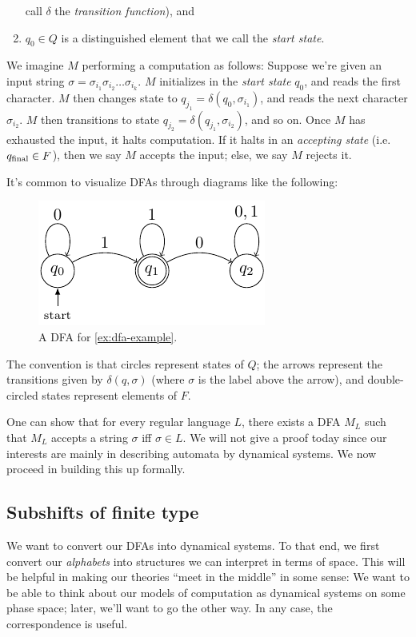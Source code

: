 \documentclass{fkpaper}
\begin{document}
\begin{multicols}{2}
\begin{definition}
\begin{enumerate}
      call $\delta$ the \emph{transition function}), and
    \item $q_0 \in Q$ is a distinguished element that we call the
      \emph{start state}. \qedhere
  \end{enumerate}
\end{definition}
We imagine $M$ performing a computation as follows: Suppose we're
given an input string $\sigma = \sigma_{i_1} \sigma_{i_2} \ldots
\sigma_{i_k}$. $M$ initializes in the \emph{start state} $q_0$, and
reads the first character. $M$ then changes state to $q_{j_1} =
\delta(q_0, \sigma_{i_1})$, and reads the next character
$\sigma_{i_2}$. $M$ then transitions to state $q_{j_2} =
\delta(q_{j_1}, \sigma_{i_2})$, and so on. Once $M$ has exhausted the
input, it halts computation. If it halts in an \emph{accepting state}
(i.e.\ $q_{\rm final} \in F$), then we say $M$ accepts the input;
else, we say $M$ rejects it.

It's common to visualize DFAs through diagrams like the following:
\begin{figure}[H]
  \centering
  \includegraphics[scale=1.2]{figures/dfa-example.pdf}
  \caption{A DFA for \cref{ex:dfa-example}.}
\end{figure}
The convention is that circles represent states of $Q$; the arrows
represent the transitions given by $\delta(q, \sigma)$ (where $\sigma$
is the label above the arrow), and double-circled states represent
elements of $F$.

One can show that for every regular language $L$, there exists a DFA
$M_L$ such that $M_L$ accepts a string $\sigma$ iff $\sigma \in L$. We
will not give a proof today since our interests are mainly in
describing automata by dynamical systems. We now proceed in building
this up formally.

\subsection{Subshifts of finite type}
We want to convert our DFAs into dynamical systems. To that end, we
first convert our \emph{alphabets} into structures we can interpret in
terms of space. {\color{blue} This will be helpful in making our
  theories ``meet in the middle'' in some sense: We want to be able to
  think about our models of computation as dynamical systems on some
  phase space; later, we'll want to go the other way. In any case, the
  correspondence is useful.
}


\end{multicols}
\end{document}
